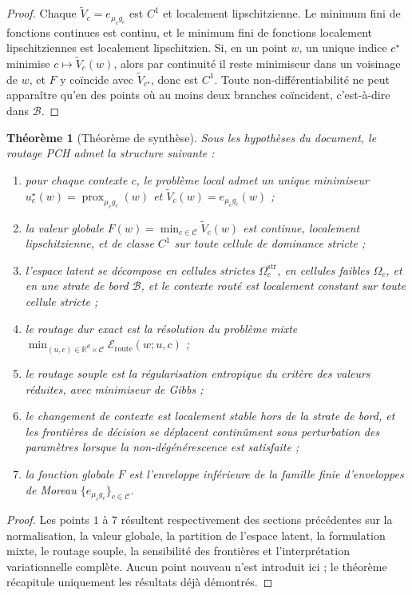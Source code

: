 \documentclass[11pt,a4paper]{article}
\newtheorem{theorem}{Théorème}[section]
\DeclareMathOperator{\prox}{prox}
\newcommand{\R}{\mathbb R}
\newcommand{\Ccal}{\mathcal C}
\begin{document}
\begin{proof}
Chaque \(\widetilde V_c=e_{\mu_c g_c}\) est \(C^1\) et localement lipschitzienne. Le minimum fini de fonctions continues est continu, et le minimum fini de fonctions localement lipschitziennes est localement lipschitzien. Si, en un point \(w\), un unique indice \(c^\star\) minimise \(c\mapsto \widetilde V_c(w)\), alors par continuité il reste minimiseur dans un voisinage de \(w\), et \(F\) y coïncide avec \(\widetilde V_{c^\star}\), donc est \(C^1\). Toute non-différentiabilité ne peut apparaître qu'en des points où au moins deux branches coïncident, c'est-à-dire dans \(\mathcal B\).
\end{proof}

\begin{theorem}[Théorème de synthèse]
Sous les hypothèses du document, le routage PCH admet la structure suivante :
\begin{enumerate}[leftmargin=2em]
\item pour chaque contexte \(c\), le problème local admet un unique minimiseur \(u_c^\star(w)=\prox_{\mu_c g_c}(w)\) et \(\widetilde V_c(w)=e_{\mu_c g_c}(w)\) ;
\item la valeur globale \(F(w)=\min_{c\in\Ccal}\widetilde V_c(w)\) est continue, localement lipschitzienne, et de classe \(C^1\) sur toute cellule de dominance stricte ;
\item l'espace latent se décompose en cellules strictes \(\Omega_c^{\mathrm{str}}\), en cellules faibles \(\Omega_c\), et en une strate de bord \(\mathcal B\), et le contexte routé est localement constant sur toute cellule stricte ;
\item le routage dur exact est la résolution du problème mixte \(\min_{(u,c)\in\R^d\times\Ccal}\mathcal E_{\mathrm{route}}(w;u,c)\) ;
\item le routage souple est la régularisation entropique du critère des valeurs réduites, avec minimiseur de Gibbs ;
\item le changement de contexte est localement stable hors de la strate de bord, et les frontières de décision se déplacent continûment sous perturbation des paramètres lorsque la non-dégénérescence est satisfaite ;
\item la fonction globale \(F\) est l'enveloppe inférieure de la famille finie d'enveloppes de Moreau \(\{e_{\mu_c g_c}\}_{c\in\Ccal}\).
\end{enumerate}
\end{theorem}

\begin{proof}
Les points \(1\) à \(7\) résultent respectivement des sections précédentes sur la normalisation, la valeur globale, la partition de l'espace latent, la formulation mixte, le routage souple, la sensibilité des frontières et l'interprétation variationnelle complète. Aucun point nouveau n'est introduit ici ; le théorème récapitule uniquement les résultats déjà démontrés.
\end{proof}
\end{document}
